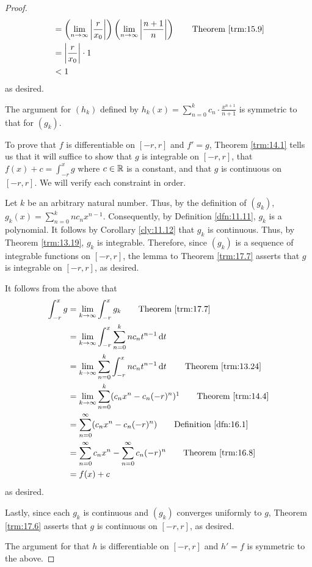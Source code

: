 \documentclass[../main.tex]{subfiles}
\begin{document}
\begin{theorem}
\begin{proof}
\begin{align*}
            &= \left( \lim_{n\to\infty}\left| \frac{r}{x_0} \right| \right)\left( \lim_{n\to\infty}\left| \frac{n+1}{n} \right| \right)\tag*{Theorem \ref{trm:15.9}}\\
            &= \left| \frac{r}{x_0} \right|\cdot 1\\
            &< 1
        \end{align*}
        as desired.\par\medskip
        The argument for $(h_k)$ defined by $h_k(x)=\sum_{n=0}^kc_n\cdot\frac{x^{n+1}}{n+1}$ is symmetric to that for $(g_k)$.\par\bigskip
        To prove that $f$ is differentiable on $[-r,r]$ and $f'=g$, Theorem \ref{trm:14.1} tells us that it will suffice to show that $g$ is integrable on $[-r,r]$, that $f(x)+c=\int_{-r}^xg$ where $c\in\mathbb{R}$ is a constant, and that $g$ is continuous on $[-r,r]$. We will verify each constraint in order.\par\smallskip
        Let $k$ be an arbitrary natural number. Thus, by the definition of $(g_k)$, $g_k(x)=\sum_{n=0}^knc_nx^{n-1}$. Consequently, by Definition \ref{dfn:11.11}, $g_k$ is a polynomial. It follows by Corollary \ref{cly:11.12} that $g_k$ is continuous. Thus, by Theorem \ref{trm:13.19}, $g_k$ is integrable. Therefore, since $(g_k)$ is a sequence of integrable functions on $[-r,r]$, the lemma to Theorem \ref{trm:17.7} asserts that $g$ is integrable on $[-r,r]$, as desired.\par
        It follows from the above that
        \begin{align*}
            \int_{-r}^xg &= \lim_{k\to\infty}\int_{-r}^xg_k\tag*{Theorem \ref{trm:17.7}}\\
            &= \lim_{k\to\infty}\int_{-r}^x\sum_{n=0}^knc_nt^{n-1}\dd{t}\\
            &= \lim_{k\to\infty}\sum_{n=0}^k\int_{-r}^xnc_nt^{n-1}\dd{t}\tag*{Theorem \ref{trm:13.24}}\\
            &= \lim_{k\to\infty}\sum_{n=0}^k(c_nx^n-c_n(-r)^n)\footnotemark\tag*{Theorem \ref{trm:14.4}}\\
            &= \sum_{n=0}^\infty(c_nx^n-c_n(-r)^n)\tag*{Definition \ref{dfn:16.1}}\\
            &= \sum_{n=0}^\infty c_nx^n-\sum_{n=0}^\infty c_n(-r)^n\tag*{Theorem \ref{trm:16.8}}\\
            &= f(x)+c
        \end{align*}
        as desired.\par
        Lastly, since each $g_k$ is continuous and $(g_k)$ converges uniformly to $g$, Theorem \ref{trm:17.6} asserts that $g$ is continuous on $[-r,r]$, as desired.\par\medskip
        The argument for that $h$ is differentiable on $[-r,r]$ and $h'=f$ is symmetric to the above.
    \end{proof}
\end{theorem}
\end{document}
